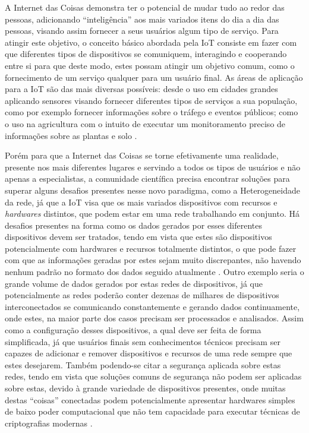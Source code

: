 \documentclass[ti,table]{texufpel} %
\begin{document}
A Internet das Coisas demonstra ter o potencial de mudar tudo ao redor das pessoas, adicionando ``inteligência'' aos mais variados itens do dia a dia das pessoas, visando assim fornecer a seus usuários algum tipo de serviço. Para atingir este objetivo, o conceito básico abordada pela IoT consiste em fazer com que diferentes tipos de dispositivos se comuniquem, interagindo e cooperando entre si para que deste modo, estes possam atingir um objetivo comum, como o fornecimento de um serviço qualquer para um usuário final. As áreas de aplicação para a IoT são das mais diversas possíveis: desde o uso em cidades grandes aplicando sensores visando fornecer diferentes tipos de serviços a sua população, como por exemplo fornecer informações sobre o tráfego e eventos públicos; como o uso na agricultura com o intuito de executar um monitoramento preciso de  informações sobre as plantas e solo \cite{gonccalves2017research}. 

  

Porém para que a Internet das Coisas se torne efetivamente uma realidade, presente nos mais diferentes lugares e servindo a todos os tipos de usuários e não apenas a especialistas, a comunidade científica precisa encontrar soluções para superar alguns desafios presentes nesse novo paradigma, como a Heterogeneidade da rede, já que a IoT visa que os mais variados dispositivos com recursos e \textit{hardwares} distintos, que podem estar em uma rede trabalhando em conjunto. Há desafios presentes na forma como os dados gerados por esses diferentes dispositivos devem ser tratados, tendo em vista que estes são dispositivos potencialmente com hardwares e recursos totalmente distintos, o que pode fazer com que as informações geradas por estes sejam muito discrepantes, não havendo nenhum padrão no formato dos dados seguido atualmente \cite{agrawal2013survey}. Outro exemplo seria o grande volume de dados gerados por estas redes de dispositivos, já que potencialmente as redes poderão conter dezenas de milhares de dispositivos interconectados se comunicando constantemente e gerando dados continuamente, onde estes, na maior parte dos casos precisam ser processados e analisados. Assim como a configuração desses dispositivos, a qual deve ser feita de forma simplificada, já que usuários finais sem conhecimentos técnicos precisam ser capazes de adicionar e remover dispositivos e recursos de uma rede sempre que estes desejarem. Também podendo-se citar a segurança aplicada sobre estas redes, tendo em vista que soluções comuns de segurança não podem ser aplicadas sobre estas,  devido à grande variedade de dispositivos presentes, onde muitas destas ``coisas'' conectadas podem potencialmente apresentar hardwares simples de baixo poder computacional que não tem capacidade para executar técnicas de criptografias modernas \cite{agrawal2013survey}.
\end{document}
